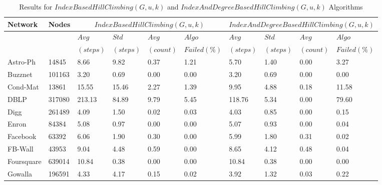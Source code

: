 \documentclass[conference]{IEEEtran}
\begin{document}
\begin{table}[htp]
\centering
\caption{Results for $IndexBasedHillClimbing(G,u,k)$ and $IndexAndDegreeBasedHillClimbing(G,u,k)$ Algorithms}
\label{sec2results}
\begin{tabular}{|l|l|l|l|l|l|l|l|l|l|}
\hline
Network &  Nodes & \multicolumn{4}{|c|}{$IndexBasedHillClimbing(G,u,k)$} & \multicolumn{4}{|c|}{$IndexAndDegreeBasedHillClimbing(G,u,k)$} \\ \hline

	
	&	&  $Avg$ & $Std$ & $Avg$ & $Algo$ &  $Avg$ & $Std$ & $Avg$ & $Algo$ \\
	
	&	& $(steps)$  & $(steps)$  & $(count)$ & $Failed(\%)$ & $(steps)$  &$(steps)$  & $(count)$ & $Failed(\%)$ \\	\hline

Astro-Ph	&	14845	&	8.66	&	9.82	&	0.37	&	1.21	&	5.70	&	1.40	&	0.00&	3.27	\\ \hline			
Buzznet	&	101163	&	3.20	&	0.69	&	0.00	&	0.00	&	3.20	&	0.69	&	0.00	&	0.00	\\ \hline
Cond-Mat	&	13861	&	15.55	&	15.46	&	2.27	&	1.39	&	9.95	&	4.88	&	0.18	&	11.58	\\ \hline
DBLP	&	317080	&	213.13	&	84.89	&	9.79	&	5.45	&	118.76	&	5.34	&	0.00	&	79.60\\ \hline
Digg	&	261489	&	4.09	&	1.50	&	0.02	&	0.03	&	4.03	&	0.85	&	0.00	&	0.15	\\ \hline
Enron	&	84384	&	5.08	&	0.97	&	0.00	&	0.00	&	5.07	&	0.93	&	0.00	&	0.04	\\ \hline				
Facebook	&	63392	&	6.06	&	1.90	&	0.30	&	0.00	&	5.99	&	1.80	&	0.31	&	0.02	\\ \hline
FB-Wall	&	43953	&	9.04	&	4.48	&	0.59	&	0.00	&	8.65	&	4.12	&	0.48	&	0.04	\\ \hline
Foursquare	&	639014	&	10.84	&	0.38	&	0.00	&	0.00	&	10.84	&	0.38&	0.00	&	0.00	\\ \hline	
Gowalla	&	196591	&	4.33	&	4.17	&	0.15	&	0.02	&	3.92	&	1.32	&	0.03	&	0.22	\\ \hline
																	
\end{tabular}	
\end{table}
\end{document}
